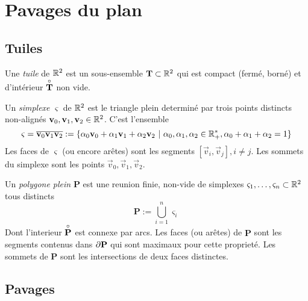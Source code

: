 \section{Pavages du plan}
\subsection{Tuiles}

\begin{definition}
	Une \emph{tuile} de $\mathbb{R}^2$ est un sous-ensemble $\mathbf{T} \subset \mathbb{R}^2$ qui est
compact (fermé, borné) et d'intérieur $\overset{\circ}{\mathbf{T}}$ non vide.
\end{definition}

\begin{definition}
	Un \emph{simplexe} $\varsigma$ de $\mathbb{R}^2$ est le triangle plein
	determiné par trois points
	distincts non-alignés $\mathbf{v}_0, \mathbf{v}_1, \mathbf{v}_2 \in \mathbb{R}^2$. C'est l'ensemble
	\begin{equation*}
		\varsigma = \overline{\mathbf{v}_0\mathbf{v}_1\mathbf{v}_2} := \{\alpha_0\mathbf{v}_0
			+ \alpha_1\mathbf{v}_1 + \alpha_2\mathbf{v}_2\  |\  \alpha_0, \alpha_1,
			\alpha_2 \in \mathbb{R}^*_+, \alpha_0 + \alpha_1 + \alpha_2 = 1\}
	\end{equation*}
	Les faces de $\varsigma$ (ou encore arêtes) sont les segments $[\vec{v}_i,
	\vec{v}_j], i \neq j$. Les sommets du simplexe sont les points $\vec{v}_0,
	\vec{v}_1, \vec{v}_2$.
\end{definition}

\begin{definition}
	Un \emph{polygone plein} $\mathbf{P}$ est une reunion finie, non-vide de simplexes
	$\varsigma_1,
	\dots, \varsigma_n \subset \mathbb{R}^2$ tous distincts
	\begin{equation*}
		\mathbf{P} := \bigcup_{i=1}^n\varsigma_i
	\end{equation*}
	Dont l'interieur $\overset{\circ}{\mathbf{P}}$ est connexe par arcs. Les faces (ou arêtes)
	de $\mathbf{P}$ sont les segments contenus dans $\partial \mathbf{P}$ qui sont
	maximaux pour cette proprieté. Les sommets de $\mathbf{P}$ sont les
	intersections de deux faces distinctes.
\end{definition}

\subsection{Pavages}

